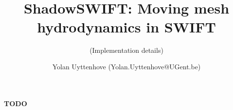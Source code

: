 



\title{ShadowSWIFT: Moving mesh hydrodynamics in SWIFT}
\subtitle{(Implementation details)}
\author{Yolan Uyttenhove (Yolan.Uyttenhove@UGent.be)}
\date{}








	



\maketitle




\textbf{TODO}

